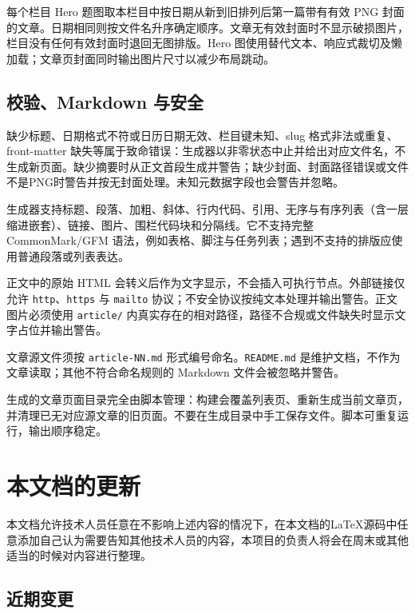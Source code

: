 \documentclass[fontset=fandol]{ctexrep}
\begin{document}
每个栏目 Hero 题图取本栏目中按日期从新到旧排列后第一篇带有有效 PNG 封面的文章。日期相同则按文件名升序确定顺序。文章无有效封面时不显示破损图片，栏目没有任何有效封面时退回无图排版。Hero 图使用替代文本、响应式裁切及懒加载；文章页封面同时输出图片尺寸以减少布局跳动。

\subsection{校验、Markdown 与安全}

缺少标题、日期格式不符或日历日期无效、栏目键未知、slug 格式非法或重复、front-matter 缺失等属于致命错误：生成器以非零状态中止并给出对应文件名，不生成新页面。缺少摘要时从正文首段生成并警告；缺少封面、封面路径错误或文件不是PNG时警告并按无封面处理。未知元数据字段也会警告并忽略。

生成器支持标题、段落、加粗、斜体、行内代码、引用、无序与有序列表（含一层缩进嵌套）、链接、图片、围栏代码块和分隔线。它不支持完整 CommonMark/GFM 语法，例如表格、脚注与任务列表；遇到不支持的排版应使用普通段落或列表表达。

正文中的原始 HTML 会转义后作为文字显示，不会插入可执行节点。外部链接仅允许 \verb|http|、\verb|https| 与 \verb|mailto| 协议；不安全协议按纯文本处理并输出警告。正文图片必须使用 \verb|article/| 内真实存在的相对路径，路径不合规或文件缺失时显示文字占位并输出警告。

文章源文件须按 \verb|article-NN.md| 形式编号命名。\verb|README.md| 是维护文档，不作为文章读取；其他不符合命名规则的 Markdown 文件会被忽略并警告。

生成的文章页面目录完全由脚本管理：构建会覆盖列表页、重新生成当前文章页，并清理已无对应源文章的旧页面。不要在生成目录中手工保存文件。脚本可重复运行，输出顺序稳定。

\section{本文档的更新}

本文档允许技术人员任意在不影响上述内容的情况下，在本文档的\LaTeX 源码中任意添加自己认为需要告知其他技术人员的内容，本项目的负责人将会在周末或其他适当的时候对内容进行整理。

\subsection{近期变更}
\end{document}
